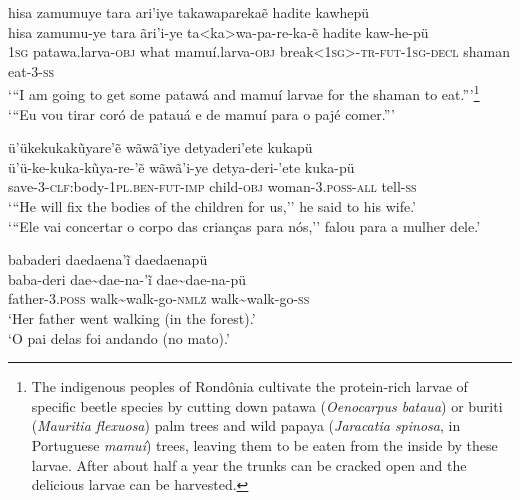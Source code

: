 \documentclass[output=paper,
modfonts,nonflat
]{langsci/langscibook}
\begin{document}
\ea   hisa zamumuye tara ari'iye takawaparekaẽ hadite kawhepü \\[.3em]
\gll 	hisa zamumu-ye tara ãri'i-ye ta<ka>wa-pa-re-ka-ẽ hadite kaw-he-pü\\
\textsc{1sg} patawa.larva-\textsc{obj} what mamuí.larva-\textsc{obj} break<\textsc{1sg}>-\textsc{tr-fut-1sg-decl} shaman eat-3-\textsc{ss}\\
\glt    `{``}I am going to get some patawá and mamuí larvae for the shaman to eat.{''}'\footnote{The indigenous peoples of Rondônia cultivate the protein-rich larvae of specific beetle species by cutting down patawa (\textit{Oenocarpus bataua}) or buriti (\textit{Mauritia flexuosa}) palm trees and wild papaya (\textit{Jaracatia spinosa}, in Portuguese \textit{mamuí}) trees, leaving them to be eaten from the inside by these larvae. After about half a year the trunks can be cracked open and the delicious larvae can be harvested.} \\
`{``}Eu vou tirar coró de patauá e de mamuí para o pajé comer.{''}'\\
\z

\ea   ü'ükekukakũyare'ẽ wãwã'iye detyaderi'ete kukapü \\[.3em]
\gll 	ü'ü-ke-kuka-kũya-re-'ẽ wãwã'i-ye detya-deri-'ete kuka-pü\\
 save-3-\textsc{clf:}body-\textsc{1pl.ben-fut-imp} child-\textsc{obj}  woman-\textsc{3.poss-all} tell-\textsc{ss}\\
\glt    `{``}He will fix the bodies of the children for us,'' he said to his wife.' \\
`{``}Ele vai concertar o corpo das crianças para nós,'' falou para a mulher dele.'
\z

\ea   babaderi daedaena'ĩ  daedaenapü \\[.3em]
\gll 	 baba-deri dae\textasciitilde dae-na-'ĩ  dae\textasciitilde dae-na-pü \\
father-\textsc{3.poss} walk\textasciitilde walk-go-\textsc{nmlz}  walk\textasciitilde walk-go-\textsc{ss}\\
\glt  `Her father went walking (in the forest).'  \\
`O pai delas foi andando (no mato).'
\end{document}
